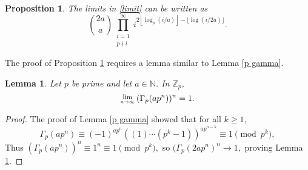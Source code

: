 \documentclass[12pt, letter]{article}    %
\theoremstyle{plain}
\newtheorem{lemma}[theorem]{Lemma}
\newtheorem{proposition}[theorem]{Proposition}
\theoremstyle{definition}
\numberwithin{equation}{section}
\newcommand{\Lim}[1]{\raisebox{0.5ex}{\scalebox{0.8}{$\displaystyle \lim_{#1}\;$}}}
\newcommand{\integers}{\mathbb{Z}}
\newcommand{\naturals}{\mathbb{N}}
\newcommand{\lemref}[1]{Lemma \ref{#1}}
\newcommand{\propref}[1]{Proposition \ref{#1}}
\newcommand{\thlabel}[1]{\label{#1}}
\providecommand{\floor}[1]{\left \lfloor #1 \right \rfloor }
\begin{document}
\begin{proposition}\thlabel{re limit}  The limits in \eqref{limit} can be written as
$$\binom{2a}{a}\prod_{\substack{i=1\\p\nmid i}}^{\infty}i^{2\floor{\log_p(i/a)}-\lfloor{\log(i/2a)}\rfloor}.$$
\end{proposition} 

The proof of \propref{re limit} requires a lemma similar to \lemref{p gamma}.

\begin{lemma}\thlabel{p gamma n}
Let $p$ be prime and let $a\in\naturals$. In $\integers_p$, $$\Lim{n\rightarrow\infty}(\Gamma_p(ap^n))^n=1.$$
\end{lemma}

\begin{proof} The proof of \lemref{p gamma} showed that for all $k\geq 1,$
$$\Gamma_p(ap^n)\equiv(-1)^{ap^n}((1)\cdots(p^k-1))^{ap^{n-k}}\equiv1\pmod{p^k},$$ Thus
$(\Gamma_p(ap^n))^n\equiv 1^n\equiv 1\pmod{p^k},$ so $(\Gamma_p(2ap^n)^n\rightarrow1,$ proving \lemref{p gamma n}.
\end{proof}
\end{document}
